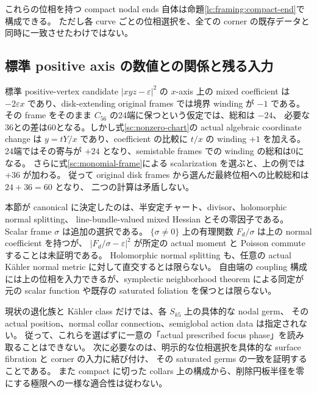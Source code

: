 これらの位相を持つ compact nodal ends 自体は命題\ref{lc:framing:compact-end}で構成できる。
ただし各 curve ごとの位相選択を、全ての corner の既存データと同時に一致させたわけではない。

\subsection{標準 positive axis の数値との関係と残る入力}

標準 positive-vertex candidate $|xyz-\varepsilon|^2$ の $x$-axis 上の mixed coefficient は
$-2\varepsilon x$ であり、disk-extending original frames では境界 winding が $-1$ である。
その frame をそのまま $C_{56}$ の24端に保つという仮定では、総和は $-24$、
必要な36との差は60となる。しかし式\eqref{sc:nonzero-chart}の actual algebraic coordinate change は
$y=tY/x$ であり、coefficient の比較に $t/x$ の winding $+1$ を加える。
24端ではその寄与が $+24$ となり、semistable frames での winding の総和は0になる。
さらに式\eqref{sc:monomial-frame}による scalarization を選ぶと、上の例では $+36$ が加わる。
従って original disk frames から選んだ最終位相への比較総和は $24+36=60$ となり、
二つの計算は矛盾しない。

\begin{remark}\label{sc:symplectic-scope}
本節が canonical に決定したのは、半安定チャート、divisor、holomorphic normal splitting、
line-bundle-valued mixed Hessian とその零因子である。
Scalar frame $\sigma$ は追加の選択である。
$\{\sigma\ne0\}$ 上の有理関数 $F_d/\sigma$ は上の normal coefficient を持つが、
$|F_d/\sigma-\varepsilon|^2$ が所定の actual moment と Poisson commute することは未証明である。
Holomorphic normal splitting も、任意の actual Kähler normal metric に対して直交するとは限らない。
自由端の coupling 構成には上の位相を入力できるが、symplectic neighborhood theorem による同定が
元の scalar function や既存の saturated foliation を保つとは限らない。

現状の退化族と Kähler class だけでは、各 $S_{k5}$ 上の具体的な nodal germ、
その actual position、normal collar connection、semiglobal action data は指定されない。
従って、これらを選ばずに一意の「actual prescribed focus phase」を読み取ることはできない。
次に必要なのは、明示的な位相選択を具体的な surface fibration と corner の入力に結び付け、
その saturated germs の一致を証明することである。
また compact に切った collars 上の構成から、削除円板半径を零にする極限への一様な適合性は従わない。
\end{remark}

